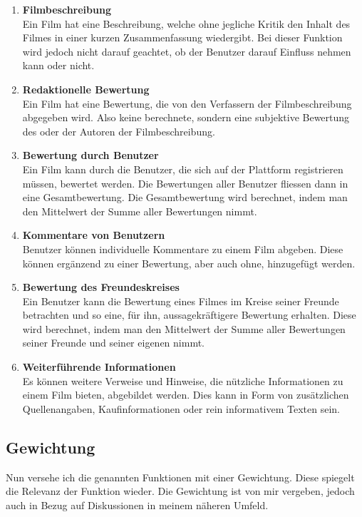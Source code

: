 \begin{enumerate}
    \item \textbf{Filmbeschreibung}\\
          Ein Film hat eine Beschreibung, welche ohne jegliche Kritik den Inhalt
          des Filmes in einer kurzen Zusammenfassung wiedergibt. Bei dieser Funktion
          wird jedoch nicht darauf geachtet, ob der Benutzer darauf Einfluss nehmen
          kann oder nicht.
    \item \textbf{Redaktionelle Bewertung}\\
          Ein Film hat eine Bewertung, die von den Verfassern der Filmbeschreibung 
          abgegeben wird. Also keine berechnete, sondern eine subjektive Bewertung
          des oder der Autoren der Filmbeschreibung.
    \item \textbf{Bewertung durch Benutzer}\\
          Ein Film kann durch die Benutzer, die sich auf der Plattform
          registrieren müssen, bewertet werden. Die Bewertungen aller Benutzer
          fliessen dann in eine Gesamtbewertung. Die Gesamtbewertung wird berechnet,
          indem man den Mittelwert der Summe aller Bewertungen nimmt.
    \item \textbf{Kommentare von Benutzern}\\
          Benutzer können individuelle Kommentare zu einem Film abgeben. Diese
          können ergänzend zu einer Bewertung, aber auch ohne, hinzugefügt werden.
    \item \textbf{Bewertung des Freundeskreises}\\
          Ein Benutzer kann die Bewertung eines Filmes im Kreise seiner Freunde
          betrachten und so eine, für ihn, aussagekräftigere Bewertung erhalten.
          Diese wird berechnet, indem man den Mittelwert der Summe aller Bewertungen
          seiner Freunde und seiner eigenen nimmt.
    \item \textbf{Weiterführende Informationen}\\
          Es können weitere Verweise und Hinweise, die nützliche Informationen
          zu einem Film bieten, abgebildet werden. Dies kann in Form von zusätzlichen
          Quellenangaben, Kaufinformationen oder rein informativem Texten sein.
\end{enumerate}

\subsection{Gewichtung}
Nun versehe ich die genannten Funktionen mit einer Gewichtung. Diese spiegelt die
Relevanz der Funktion wieder. Die Gewichtung ist von mir vergeben, jedoch auch in Bezug
auf Diskussionen in meinem näheren Umfeld.

